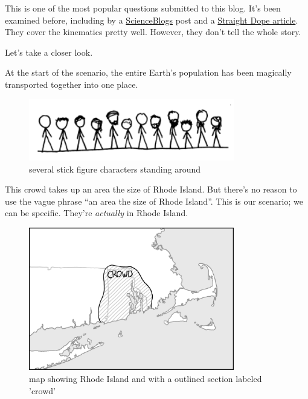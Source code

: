 \hfill{}

{This is one of the most popular questions submitted to this blog. It’s been examined before, including by a \href{http://scienceblogs.com/dotphysics/2010/08/26/what-if-everyone-jumped/}{ScienceBlogs} post and a \href{http://www.straightdope.com/columns/read/142/if-all-chinese-jumped-at-once-would-cataclysm-result} {Straight Dope article}. They cover the kinematics pretty well. However, they don’t tell the whole story.}

{Let’s take a closer look.}

{At the start of the scenario, the entire Earth’s population has been magically transported together into one place.}

\begin{figure}[!htbp]
\centering
\includegraphics[scale=0.5, max width=0.8\textwidth]{imgs/a/8/everybody_jump_standing.png}
\caption{several stick figure characters standing around}
\end{figure}

{This crowd takes up an area the size of Rhode Island. But there’s no reason to use the vague phrase “an area the size of Rhode Island”. This is our scenario; we can be specific. They’re \emph{actually} in Rhode Island.}

\begin{figure}[!htbp]
\centering
\includegraphics[scale=0.5, max width=0.8\textwidth]{imgs/a/8/everybody_jump_map1.png}
\caption{map showing Rhode Island and with a outlined section labeled 'crowd'}
\end{figure}

